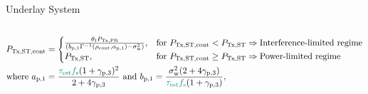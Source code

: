 \documentclass[16pt]{beamer}
\begin{document}
\begin{frame}[t]{Underlay System}
\begin{columns}
\begin{column}{0.55\columnwidth}
\begin{center}
{
                }
		\end{center}
		\end{column}
	\end{columns}
	\begin{block}{}%
		\vspace{-4mm}
		\begin{align*}
			\preg &= 
			\begin{cases} 
				\frac{\ite \ptran}{ \left(\bpo \Gamma^{-1}(\opc, \apo) - \nps  \right)}, & \mbox{for } \preg < \pc \Rightarrow \text{Interference-limited regime}\\
				\pc, & \mbox{for } \preg \ge \pc \Rightarrow \text{Power-limited regime}
				\end{cases} \\
				\text{where  } \apo &= \frac{{\color{kit-green100}{\test \fsam}} (1 + \snrrcvdu)^2}{2 + 4 \snrrcvdu} \text{ and } \bpo = \frac{\nps (2 + 4 \snrrcvdu)}{{\color{kit-green100}{\test \fsam}} (1 + \snrrcvdu)},
			\end{align*}
	\end{block}
\end{frame}
\end{document}
